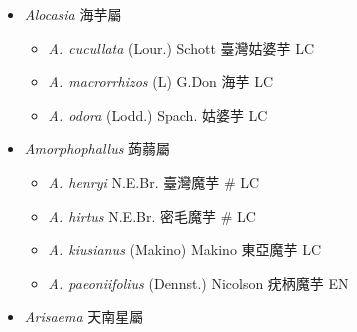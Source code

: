 
  \begin{itemize}
 \item[] \textit{Alocasia} 海芋屬
                                
  \begin{itemize}
        \item[] \textit{A. cucullata} (Lour.) Schott  臺灣姑婆芋   LC
        \item[] \textit{A. macrorrhizos} (L) G.Don  海芋   LC
        \item[] \textit{A. odora} (Lodd.) Spach.  姑婆芋   LC
  \end{itemize}
 \item[] \textit{Amorphophallus} 蒟蒻屬
                                
  \begin{itemize}
        \item[] \textit{A. henryi} N.E.Br.  臺灣魔芋  \# LC
        \item[] \textit{A. hirtus} N.E.Br.  密毛魔芋  \# LC
        \item[] \textit{A. kiusianus} (Makino) Makino  東亞魔芋   LC
        \item[] \textit{A. paeoniifolius} (Dennst.) Nicolson  疣柄魔芋   EN
  \end{itemize}
 \item[] \textit{Arisaema} 天南星屬
                                

\end{itemize}
